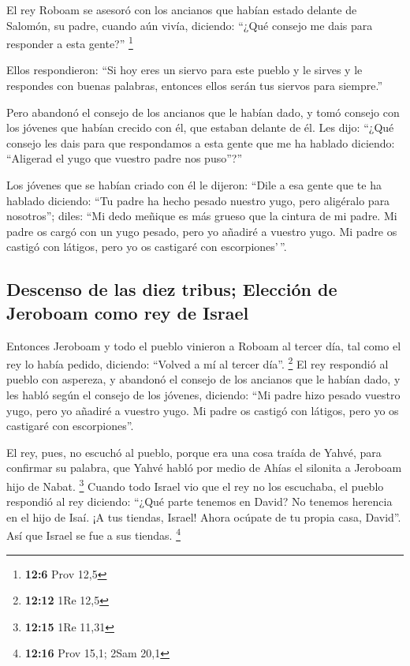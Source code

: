  El rey Roboam se asesoró con los ancianos que habían
estado delante de Salomón, su padre, cuando aún vivía, diciendo: ``¿Qué
consejo me dais para responder a esta gente?'' \footnote{\textbf{12:6}
  Prov 12,5}

 Ellos respondieron: ``Si hoy eres un siervo para este
pueblo y le sirves y le respondes con buenas palabras, entonces ellos
serán tus siervos para siempre.''

 Pero abandonó el consejo de los ancianos que le habían
dado, y tomó consejo con los jóvenes que habían crecido con él, que
estaban delante de él.  Les dijo: ``¿Qué consejo les dais
para que respondamos a esta gente que me ha hablado diciendo: ``Aligerad
el yugo que vuestro padre nos puso''?''

 Los jóvenes que se habían criado con él le dijeron:
``Dile a esa gente que te ha hablado diciendo: ``Tu padre ha hecho
pesado nuestro yugo, pero aligéralo para nosotros''; diles: ``Mi dedo
meñique es más grueso que la cintura de mi padre.  Mi
padre os cargó con un yugo pesado, pero yo añadiré a vuestro yugo. Mi
padre os castigó con látigos, pero yo os castigaré con escorpiones'\,''.

\hypertarget{descenso-de-las-diez-tribus-elecciuxf3n-de-jeroboam-como-rey-de-israel}{%
\subsection{Descenso de las diez tribus; Elección de Jeroboam como rey
de
Israel}\label{descenso-de-las-diez-tribus-elecciuxf3n-de-jeroboam-como-rey-de-israel}}

 Entonces Jeroboam y todo el pueblo vinieron a Roboam al
tercer día, tal como el rey lo había pedido, diciendo: ``Volved a mí al
tercer día''. \footnote{\textbf{12:12} 1Re 12,5}  El rey
respondió al pueblo con aspereza, y abandonó el consejo de los ancianos
que le habían dado,  y les habló según el consejo de los
jóvenes, diciendo: ``Mi padre hizo pesado vuestro yugo, pero yo añadiré
a vuestro yugo. Mi padre os castigó con látigos, pero yo os castigaré
con escorpiones''.

 El rey, pues, no escuchó al pueblo, porque era una cosa
traída de Yahvé, para confirmar su palabra, que Yahvé habló por medio de
Ahías el silonita a Jeroboam hijo de Nabat. \footnote{\textbf{12:15} 1Re
  11,31}  Cuando todo Israel vio que el rey no los
escuchaba, el pueblo respondió al rey diciendo: ``¿Qué parte tenemos en
David? No tenemos herencia en el hijo de Isaí. ¡A tus tiendas, Israel!
Ahora ocúpate de tu propia casa, David''. Así que Israel se fue a sus
tiendas. \footnote{\textbf{12:16} Prov 15,1; 2Sam 20,1}

